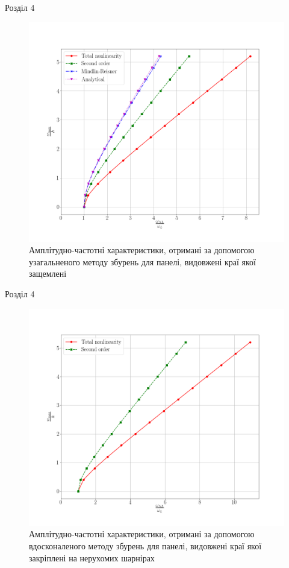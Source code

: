 \documentclass[8pt]{beamer}
\numberwithin{figure}{section}
\numberwithin{equation}{section}
\numberwithin{table}{section}
\begin{document}
\begin{frame}{Розділ 4}

\begin{figure}
	\includegraphics[scale=0.2]{pic/AFRC1.png}
		\caption{Амплітудно-частотні характеристики, отримані за допомогою узагальненого методу збурень для панелі, видовжені краї якої защемлені}
		\label{fig:AFR_C}
\end{figure}


\end{frame}

\begin{frame}{Розділ 4}

\begin{figure}
	\includegraphics[scale=0.2]{pic/AFRC2.png}
		\caption{Амплітудно-частотні характеристики, отримані за допомогою вдосконаленого методу збурень для панелі, видовжені краї якої закріплені на нерухомих шарнірах}
		\label{fig:AFR_H}
\end{figure}


\end{frame}



%
\end{document}

